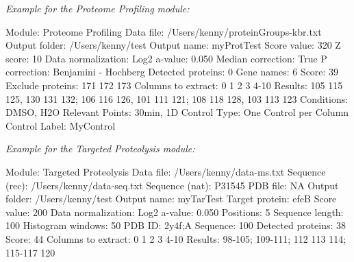 \textit{Example for the Proteome Profiling module:}

Module: Proteome Profiling\newline
Data file: /Users/kenny/proteinGroups-kbr.txt\newline
Output folder: /Users/kenny/test\newline
Output name: myProtTest\newline
Score value: 320\newline
Z score: 10\newline
Data normalization: Log2\newline
a-value: 0.050\newline
Median correction: True\newline
P correction: Benjamini - Hochberg\newline
Detected proteins: 0\newline
Gene names: 6\newline
Score: 39\newline
Exclude proteins: 171 172 173\newline
Columns to extract: 0 1 2 3 4-10\newline
Results: 105 115 125, 130 131 132; 106 116 126, 101 111 121; 108 118 128, 103 113 123\newline
Conditions: DMSO, H2O\newline
Relevant Points: 30min, 1D\newline
Control Type: One Control per Column\newline
Control Label: MyControl\newline

\textit{Example for the Targeted Proteolysis module:}

Module: Targeted Proteolysis\newline
Data file: /Users/kenny/data-ms.txt\newline
Sequence (rec): /Users/kenny/data-seq.txt\newline
Sequence (nat): P31545\newline
PDB file: NA\newline
Output folder: /Users/kenny/test\newline
Output name: myTarTest\newline
Target protein: efeB\newline
Score value: 200\newline
Data normalization: Log2\newline
a-value: 0.050\newline
Positions: 5\newline
Sequence length: 100\newline
Histogram windows: 50\newline
PDB ID: 2y4f;A\newline
Sequence: 100\newline
Detected proteins: 38\newline
Score: 44\newline
Columns to extract: 0 1 2 3 4-10\newline
Results: 98-105; 109-111; 112 113 114; 115-117 120\newline


